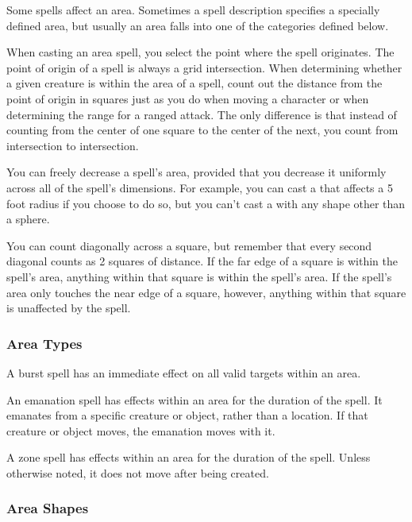         Some spells affect an area.
        Sometimes a spell description specifies a specially defined area, but usually an area falls into one of the categories defined below.

        When casting an area spell, you select the point where the spell originates.
        The point of origin of a spell is always a grid intersection.
        When determining whether a given creature is within the area of a spell, count out the distance from the point of origin in squares just as you do when moving a character or when determining the range for a ranged attack.
        The only difference is that instead of counting from the center of one square to the center of the next, you count from intersection to intersection.

        You can freely decrease a spell's area, provided that you decrease it uniformly across all of the spell's dimensions.
        For example, you can cast a  that affects a 5 foot radius if you choose to do so, but you can't cast a  with any shape other than a sphere.

        You can count diagonally across a square, but remember that every second diagonal counts as 2 squares of distance.
        If the far edge of a square is within the spell's area, anything within that square is within the spell's area.
        If the spell's area only touches the near edge of a square, however, anything within that square is unaffected by the spell.

        \subsubsection{Area Types}\label{Area Types}

             A burst spell has an immediate effect on all valid targets within an area.

             An emanation spell has effects within an area for the duration of the spell.
            It emanates from a specific creature or object, rather than a location.
            If that creature or object moves, the emanation moves with it.

             A zone spell has effects within an area for the duration of the spell.
            Unless otherwise noted, it does not move after being created.

        \subsubsection{Area Shapes}

